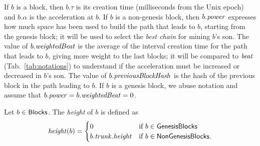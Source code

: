 %
If $b$ is a block, then $b.\tau$ is its creation time (milliseconds from the Unix epoch)
and $b.\alpha$ is the acceleration at $b$. If $b$ is a non-genesis block, then
$b.{\mathit{power}}$ expresses how much space has been used to build the path that leads to $b$,
starting from the genesis block; it will be used to select the \emph{best chain} for mining
$b$'s son. The value of $b.\mathit{weightedBeat}$ is the average of the interval creation time
for the path that leads to $b$, giving more weight to the last blocks; it will be
compared to ${\mathit{beat}}$ (Tab.~\ref{tab:notations}) to understand if the acceleration
must be increased or decreased in $b$'s son.
The value of $b.{\mathit{previousBlockHash}}$ is the hash of the previous block in the path leading to $b$.
If $b$ is a genesis block, we abuse notation and assume that $b.{\mathit{power}}=b.\mathit{weightedBeat}=0$.

\begin{definition}\label{def:block_height}
  Let $b\in{\mathsf{Blocks}}$. The \emph{height} of $b$ is defined as
  \[
  {\mathit{height}}(b)=\begin{cases}
  0 & \text{if $b\in{\mathsf{GenesisBlocks}}$}\\
  b.{\mathit{trunk}}.{\mathit{height}} & \text{if $b\in{\mathsf{NonGenesisBlocks}}$.}
  \end{cases}
  \]
\end{definition}

